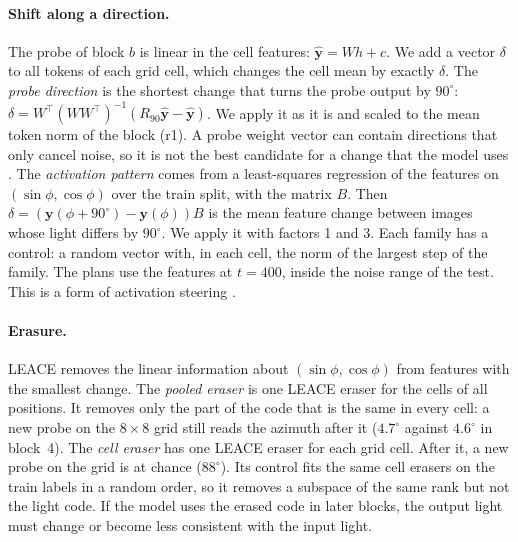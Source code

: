 \documentclass[10pt]{article}
\newcommand{\degr}{^\circ}
\begin{document}
\paragraph{Shift along a direction.}
The probe of block $b$ is linear in the cell features: $\hat{\mathbf y}=W h+c$.
We add a vector $\delta$ to all tokens of each grid cell, which changes the cell mean by exactly $\delta$.
The \emph{probe direction} is the shortest change that turns the probe output by $90\degr$: $\delta=W^\top(WW^\top)^{-1}(R_{90}\hat{\mathbf y}-\hat{\mathbf y})$. We apply it as it is and scaled to the mean token norm of the block (r1).
A probe weight vector can contain directions that only cancel noise, so it is not the best candidate for a change that the model uses \citep{haufe2014interpretation,marks2024geometry}.
The \emph{activation pattern} comes from a least-squares regression of the features on $(\sin\phi,\cos\phi)$ over the train split, with the matrix $B$. Then $\delta=(\mathbf y(\phi+90\degr)-\mathbf y(\phi))B$ is the mean feature change between images whose light differs by $90\degr$. We apply it with factors 1 and 3.
Each family has a control: a random vector with, in each cell, the norm of the largest step of the family.
The plans use the features at $t=400$, inside the noise range of the test.
This is a form of activation steering \citep{turner2023activation,chen2023beyond}.

\paragraph{Erasure.}
LEACE \citep{belrose2023leace} removes the linear information about $(\sin\phi,\cos\phi)$ from features with the smallest change.
The \emph{pooled eraser} is one LEACE eraser for the cells of all positions. It removes only the part of the code that is the same in every cell: a new probe on the $8\times8$ grid still reads the azimuth after it ($4.7\degr$ against $4.6\degr$ in block~4).
The \emph{cell eraser} has one LEACE eraser for each grid cell. After it, a new probe on the grid is at chance ($88\degr$).
Its control fits the same cell erasers on the train labels in a random order, so it removes a subspace of the same rank but not the light code.
If the model uses the erased code in later blocks, the output light must change or become less consistent with the input light.
\end{document}
